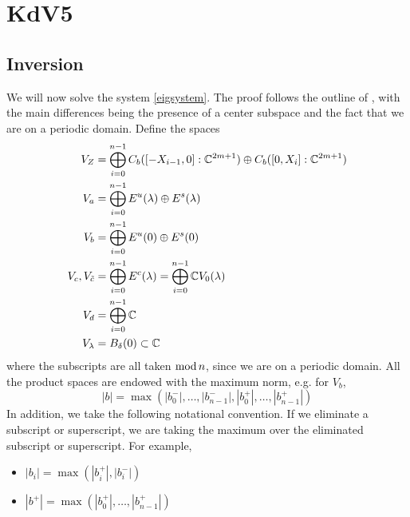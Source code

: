 \documentclass[thesis.tex]{subfiles}
\begin{document}
\iffulldocument\else
	\chapter{KdV5}
\fi

\section{Inversion}

We will now solve the system \cref{eigsystem}. The proof follows the outline of \cite[Theorem 2]{Sandstede1998}, with the main differences being the presence of a center subspace and the fact that we are on a periodic domain. Define the spaces
\begin{align*}
V_Z &= \bigoplus_{i=0}^{n-1} C_b([-X_{i-1},0]:\mathbb{C}^{2m+1}) \oplus C_b([0,X_i]:\mathbb{C}^{2m+1})  \\
V_a &= \bigoplus_{i=0}^{n-1} E^u(\lambda) \oplus E^s(\lambda) \\
V_b &= \bigoplus_{i=0}^{n-1} E^u(0) \oplus E^s(0) \\
V_c, V_{\tilde{c}} &= \bigoplus_{i=0}^{n-1} E^c(\lambda) = \bigoplus_{i=0}^{n-1} \mathbb{C} V_0(\lambda) \\
V_d &= \bigoplus_{i=0}^{n-1} \mathbb{C} \\
V_\lambda &= B_\delta(0) \subset \mathbb{C}
\end{align*}
where the subscripts are all taken $\mathop\mathrm{mod}\nolimits n$, since we are on a periodic domain. All the product spaces are endowed with the maximum norm, e.g. for $V_b$, 
\[
|b| = \max(|b_0^-|, \dots, |b_{n-1}^-|, |b_0^+|, \dots, |b_{n-1}^+|)
\]
In addition, we take the following notational convention. If we eliminate a subscript or superscript, we are taking the maximum over the eliminated subscript or superscript. For example,
\begin{itemize}
	\item $|b_i| = \max(|b_i^+|, |b_i^-|)$ 
	\item $|b^+| = \max(|b_0^+|, \dots, |b_{n-1}^+|)$
\end{itemize}
\end{document}
